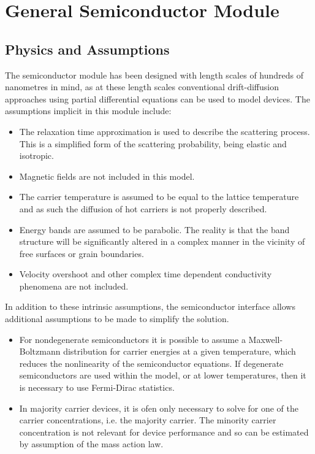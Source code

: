 \section{General Semiconductor Module}

\subsection{Physics and Assumptions}
The semiconductor module has been designed with length scales of hundreds of nanometres in mind, as at these length scales conventional drift-diffusion approaches using partial differential equations can be used to model devices. The assumptions implicit in this module include:

\begin{itemize}
	\item The relaxation time approximation is used to describe the scattering process. This is a simplified form of the scattering probability, being elastic and isotropic.
	\item Magnetic fields are not included in this model.
	\item The carrier temperature is assumed to be equal to the lattice temperature and as such the diffusion of hot carriers is not properly described.
	\item Energy bands are assumed to be parabolic. The reality is that the band structure will be significantly altered in a complex manner in the vicinity of free surfaces or grain boundaries.
	\item Velocity overshoot and other complex time dependent conductivity phenomena are not included. 
\end{itemize}

In addition to these intrinsic assumptions, the semiconductor interface allows additional assumptions to be made to simplify the solution.

\begin{itemize}
	\item For nondegenerate semiconductors it is possible to assume a Maxwell-Boltzmann distribution for carrier energies at a given temperature, which reduces the nonlinearity of the semiconductor equations. If degenerate semiconductors are used within the model, or at lower temperatures, then it is necessary to use Fermi-Dirac statistics.
	\item In majority carrier devices, it is ofen only necessary to solve for one of the carrier concentrations, i.e. the majority carrier. The minority carrier concentration is not relevant for device performance and so can be estimated by assumption of the mass action law.
\end{itemize}

